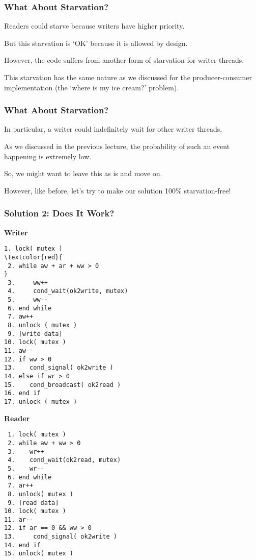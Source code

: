\begin{frame}[fragile]
	\frametitle{What About Starvation?}
	Readers could starve because writers have higher priority.

	But this starvation is `OK' because it is allowed by design.

	However, the code suffers from another form of starvation for writer threads.

	This starvation has the same nature as we discussed for the producer-consumer implementation (the `where is my ice cream?' problem).
\end{frame}


\begin{frame}
	\frametitle{What About Starvation?}
	In particular, a writer could indefinitely wait for other writer threads.

	As we discussed in the previous lecture, the probability of such an event happening is extremely low.

	So, we might want to leave this as is and move on.

	However, like before, let's try to make our solution 100\% starvation-free!
\end{frame}


\begin{frame}[fragile]
	\frametitle{Solution 2: Does It Work?}

	\begin{multicols}{2}
		\small
		\textbf{Writer}
		\begin{Verbatim}[commandchars=\\\{\}]
 1. lock( mutex )
\textcolor{red}{
 2. while aw + ar + ww > 0
}
 3.     ww++
 4.     cond_wait(ok2write, mutex)
 5.     ww--
 6. end while
 7. aw++
 8. unlock ( mutex )
 9. [write data]
10. lock( mutex )
11. aw--
12. if ww > 0
13.    cond_signal( ok2write )
14. else if wr > 0
15.    cond_broadcast( ok2read )
16. end if
17. unlock ( mutex )
		\end{Verbatim}
		\columnbreak
		\textbf{Reader}
		\begin{verbatim}
 1. lock( mutex )
 2. while aw + ww > 0
 3.    wr++
 4.    cond_wait(ok2read, mutex)
 5.    wr--
 6. end while
 7. ar++
 8. unlock( mutex )
 9. [read data]
10. lock( mutex )
11. ar--
12. if ar == 0 && ww > 0
13.     cond_signal( ok2write )
14. end if
15. unlock( mutex )


		\end{verbatim}
	\end{multicols}
\end{frame}

